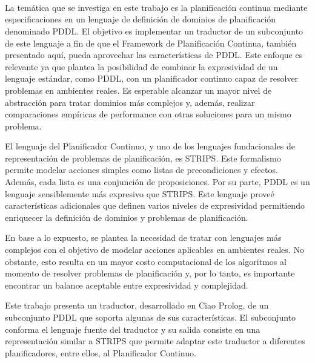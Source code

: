 \ \\
\ \\
\label{pagresum}
\\
\ \\
\ \\

\ \\

\ \\
\ \\

La tem\'atica que se investiga en este trabajo es la planificaci\'on
continua mediante especificaciones en un lenguaje de
definici\'on de dominios de planificaci\'on denominado PDDL. El objetivo es implementar
un traductor de un subconjunto de este lenguaje a fin de que el
Framework de Planificaci\'on Continua, tambi\'en presentado aqu\'i,
pueda aprovechar las caracter\'isticas de PDDL. Este enfoque es
relevante ya que plantea la posibilidad de combinar
la expresividad de un lenguaje est\'andar, como PDDL, con un planificador continuo capaz de resolver 
problemas en ambientes reales. Es esperable alcanzar un mayor nivel 
de abstracci\'on para tratar dominios m\'as complejos y, adem\'as, realizar comparaciones emp\'iricas
de performance con otras soluciones para un mismo problema.

El lenguaje del Planificador Continuo, y uno de los lenguajes
fundacionales de representaci\'on de problemas de planificaci\'on, es STRIPS. Este formalismo
permite modelar acciones simples como listas de precondiciones y
efectos. Adem\'as, cada lista es una conjunci\'on de proposiciones. 
Por su parte, PDDL es un lenguaje sensiblemente m\'as
expresivo que STRIPS. Este lenguaje prove\'e caracter\'isticas
adicionales que definen varios niveles de
expresividad permitiendo enriquecer la definici\'on de dominios y
problemas de planificaci\'on. 

En base a lo expuesto, se plantea la necesidad de tratar con lenguajes m\'as
complejos con el objetivo de modelar acciones aplicables en ambientes
reales. No obstante, esto resulta en un mayor
costo computacional de los algoritmos al momento de resolver problemas
de planificaci\'on y, por lo tanto, es importante encontrar un balance aceptable entre expresividad y complejidad.

Este trabajo presenta un traductor, desarrollado en Ciao Prolog, de un
subconjunto PDDL que soporta algunas de sus caracter\'isticas. El
subconjunto conforma el lenguaje fuente del traductor y su salida
consiste en una representaci\'on similar a STRIPS que permite adaptar este traductor a
diferentes planificadores, entre ellos, al Planificador Continuo.

